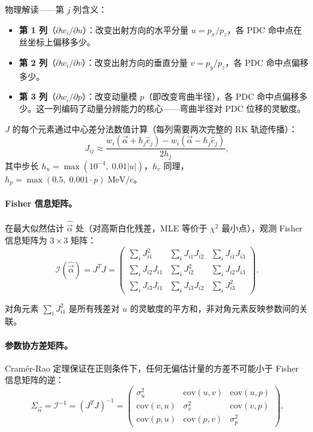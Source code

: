 \documentclass[a4paper, 11pt]{article}
\begin{document}
物理解读——第 $j$ 列含义：
\begin{itemize}[nosep]
  \item \textbf{第 1 列}（$\partial w_i / \partial u$）：改变出射方向的水平分量 $u = p_x/p_z$，各 PDC 命中点在丝坐标上偏移多少。
  \item \textbf{第 2 列}（$\partial w_i / \partial v$）：改变出射方向的垂直分量 $v = p_y/p_z$，各 PDC 命中点偏移多少。
  \item \textbf{第 3 列}（$\partial w_i / \partial p$）：改变动量模 $p$（即改变弯曲半径），各 PDC 命中点偏移多少。这一列编码了动量分辨能力的核心——弯曲半径对 PDC 位移的灵敏度。
\end{itemize}

$J$ 的每个元素通过中心差分法数值计算（每列需要两次完整的 RK 轨迹传播）：
\begin{equation}
  J_{ij} \approx \frac{w_i(\vec{\alpha} + h_j \hat{e}_j) - w_i(\vec{\alpha} - h_j \hat{e}_j)}{2 h_j},
\end{equation}
其中步长 $h_u = \max(10^{-4},\; 0.01 |u|)$，$h_v$ 同理，$h_p = \max(0.5,\; 0.001 \cdot p)\;\mathrm{MeV}/c$。

\paragraph{Fisher 信息矩阵。}
在最大似然估计 $\hat{\vec{\alpha}}$ 处（对高斯白化残差，MLE 等价于 $\chi^2$ 最小点），观测 Fisher 信息矩阵为 $3 \times 3$ 矩阵：
\begin{equation}
  \mathcal{I}(\hat{\vec{\alpha}}) = J^T J =
  \begin{pmatrix}
    \sum_i J_{i1}^2 & \sum_i J_{i1} J_{i2} & \sum_i J_{i1} J_{i3} \\
    \sum_i J_{i2} J_{i1} & \sum_i J_{i2}^2 & \sum_i J_{i2} J_{i3} \\
    \sum_i J_{i3} J_{i1} & \sum_i J_{i3} J_{i2} & \sum_i J_{i3}^2
  \end{pmatrix}.
\end{equation}

对角元素 $\sum_i J_{i1}^2$ 是所有残差对 $u$ 的灵敏度的平方和，非对角元素反映参数间的关联。

\paragraph{参数协方差矩阵。}
Cramér-Rao 定理保证在正则条件下，任何无偏估计量的方差不可能小于 Fisher 信息矩阵的逆：
\begin{equation}
  \Sigma_{\vec{\alpha}} = \mathcal{I}^{-1} = (J^T J)^{-1} =
  \begin{pmatrix}
    \sigma_u^2 & \mathrm{cov}(u,v) & \mathrm{cov}(u,p) \\
    \mathrm{cov}(v,u) & \sigma_v^2 & \mathrm{cov}(v,p) \\
    \mathrm{cov}(p,u) & \mathrm{cov}(p,v) & \sigma_p^2
  \end{pmatrix}.
  \label{eq:fisher_cov}
\end{equation}
\end{document}
